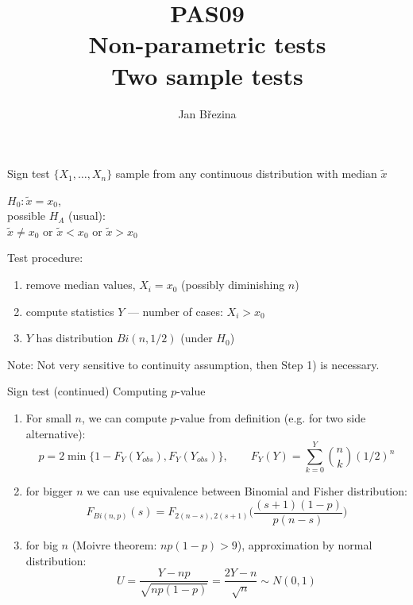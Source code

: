 \documentclass[smaller]{beamer}
\title{PAS09\\ Non-parametric tests\\Two sample tests}
\author{Jan B\v rezina}
\institute %
{
  Technical University of Liberec
}
\def\xskip{{\vspace{2ex}}}
\begin{document}
\begin{frame}
  \titlepage
\end{frame}

\begin{frame}{Sign test}
$\{X_1,\dots,X_n\}$ sample from any continuous distribution with median $\tilde{x}$

\xskip
$H_0: \tilde{x} = x_0$,\\
possible $H_A$ (usual): \\
$\tilde{x} \ne x_0$ or $\tilde{x} < x_0$ or $\tilde{x} > x_0$

\xskip
Test procedure:
\begin{enumerate}
 \item remove median values, $X_i = x_0$ (possibly diminishing $n$)
 \item compute statistics $Y$ --- number of cases: $X_i > x_0$
 \item $Y$ has distribution $Bi(n, 1/2)$ (under $H_0$)
\end{enumerate}

\xskip
Note: Not very sensitive to continuity assumption, then Step 1) is necessary.
\end{frame}

\begin{frame}{Sign test (continued)}
Computing  $p$-value
\begin{enumerate}
 \item For small $n$, we can compute $p$-value from definition (e.g. for two side alternative):
  \[
     p=2 \min\{1-F_Y(Y_{obs}), F_Y(Y_{obs})\}, \qquad F_Y(Y) = \sum_{k=0}^{Y} \binom{n}{k} (1/2)^n
  \]
 \item for bigger $n$ we can use equivalence between Binomial and Fisher distribution:
  \[
     F_{Bi(n,p)}(s) = F_{2(n-s),2(s+1)} \Big(\frac{(s+1)(1-p)}{p(n-s)}\Big)
  \]
 \item for big  $n$ (Moivre theorem: $np(1-p) >9$), approximation by normal distribution:
 \[
    U = \frac{Y - np}{\sqrt{np(1-p)}} = \frac{2Y -n}{\sqrt{n}} \sim N(0,1)
 \]
\end{enumerate}

\end{frame}

\end{document}
